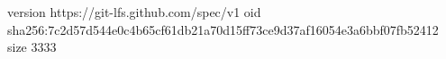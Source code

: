 version https://git-lfs.github.com/spec/v1
oid sha256:7c2d57d544e0c4b65cf61db21a70d15ff73ce9d37af16054e3a6bbf07fb52412
size 3333
